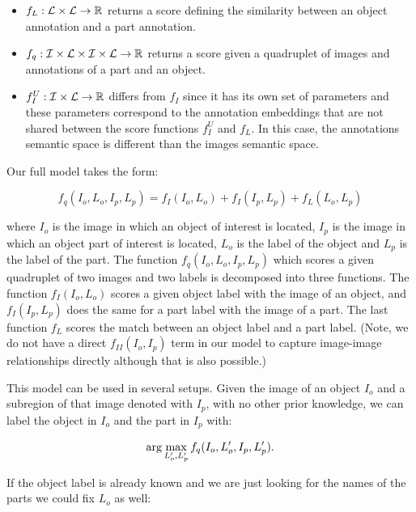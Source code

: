 \begin{itemize}

\item $f_L : {\cal L} \times {\cal L} \rightarrow {\mathbb R}$ returns a score
defining the similarity between an object annotation and a part annotation.

\item $f_q : {\cal I} \times {\cal L} \times {\cal I} \times {\cal L}
\rightarrow {\mathbb R}$ returns a score given a quadruplet of images and
annotations of a part and an object.

\item $f_I^U : {\cal I} \times {\cal L} \rightarrow {\mathbb R}$ differs from
$f_I$ since it has its own set of parameters and these parameters correspond
to the annotation embeddings that are not shared between the score functions $f_I^U$
and $f_L$. In this case, the annotations semantic space is different than the
images semantic space.

\end{itemize}


Our full model takes the form:

\[ f_q(I_o,L_o,I_p,L_p) = f_I(I_o,L_o) + f_I(I_p,L_p) + f_L(L_o,L_p) \]

where $I_o$ is the image in which an object of
interest is located, $I_p$ is the image in which an object part of interest is
located, $L_o$ is the label of the object and $L_p$ is the label of the part.
The function $f_q(I_o,L_o,I_p,L_p)$ which scores a given quadruplet of two
images and two labels is decomposed into three functions.  The function
$f_I(I_o,L_o)$ scores a given object label with the image of an object, and
$f_I(I_p,L_p)$ does the same for a part label with the image of a part.  The
last function $f_L$ scores the match between an object label and a part label.
(Note, we do not have a direct $f_{II}(I_o,I_p)$ term in our model to capture
image-image relationships directly although that is also possible.)



This model can be used in several setups.  Given the image of an object $I_o$
and a subregion of that image denoted with $I_p$, with no other prior
knowledge, we can label the object in $I_o$ and the part in $I_p$ with:

\[ \arg\max_{L'_o,L'_p}  f_q(I_o,L'_o,I_p,L'_p).\]

If the object label  is already known and we are just looking for the names of
the parts we could fix $L_o$ as well:

